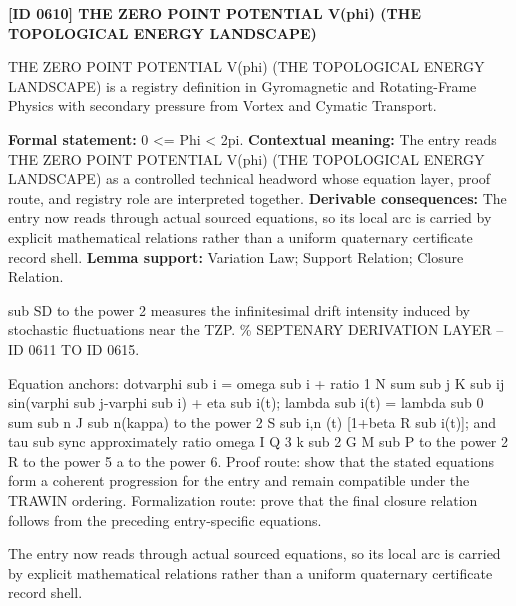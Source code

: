 \clearpage
\noindent\textbf{[ID 0610] THE ZERO POINT POTENTIAL V(phi) (THE TOPOLOGICAL ENERGY LANDSCAPE)}\par
\vspace{0.35em}
\begingroup\small
{}
THE ZERO POINT POTENTIAL V(phi) (THE TOPOLOGICAL ENERGY LANDSCAPE) is a registry definition in Gyromagnetic and Rotating-Frame Physics with secondary pressure from Vortex and Cymatic Transport.

\begingroup\footnotesize\setlength{\emergencystretch}{3em}\sloppy
\textbf{Formal statement:} 0 <= Phi < 2pi. \textbf{Contextual meaning:} The entry reads THE ZERO POINT POTENTIAL V(phi) (THE TOPOLOGICAL ENERGY LANDSCAPE) as a controlled technical headword whose equation layer, proof route, and registry role are interpreted together. \textbf{Derivable consequences:} The entry now reads through actual sourced equations, so its local arc is carried by explicit mathematical relations rather than a uniform quaternary certificate record shell. \textbf{Lemma support:} Variation Law; Support Relation; Closure Relation.\par
\endgroup

sub SD to the power 2 measures the infinitesimal drift intensity induced by stochastic fluctuations near the TZP. \% SEPTENARY DERIVATION LAYER -- ID 0611 TO ID 0615.

Equation anchors: dotvarphi sub i = omega sub i + ratio 1 N sum sub j K sub ij sin(varphi sub j-varphi sub i) + eta sub i(t); lambda sub i(t) = lambda sub 0 sum sub n J sub n(kappa) to the power 2 S sub i,n (t) [1+beta R sub i(t)]; and tau sub sync approximately ratio omega I Q 3 k sub 2 G M sub P to the power 2 R to the power 5 a to the power 6. Proof route: show that the stated equations form a coherent progression for the entry and remain compatible under the TRAWIN ordering. Formalization route: prove that the final closure relation follows from the preceding entry-specific equations.

The entry now reads through actual sourced equations, so its local arc is carried by explicit mathematical relations rather than a uniform quaternary certificate record shell.
\endgroup

